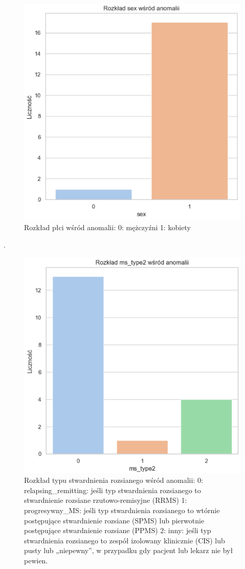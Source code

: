 \documentclass[a4paper,fleqn]{cas-dc}
\begin{document}
\begin{figure}[h]
	\includegraphics[scale=.57]{wykresy/wykres8.png}
	\caption{Rozkład płci wśród anomalii: 0: mężczyźni 1: kobiety}
	\label{FIG:1}
\end{figure}
\newpage
.
\newpage
\begin{figure}[h]
	\includegraphics[scale=.80]{wykresy/wykres9.png}
	\caption{Rozkład typu stwardnienia rozsianego wśród anomalii:  0: relapsing\_remitting: jeśli typ stwardnienia rozsianego to stwardnienie rozsiane rzutowo-remisyjne (RRMS)
1: progresywny\_MS: jeśli typ stwardnienia rozsianego to wtórnie postępujące stwardnienie rozsiane (SPMS) lub pierwotnie postępujące stwardnienie rozsiane (PPMS)
2: inny: jeśli typ stwardnienia rozsianego to zespół izolowany klinicznie (CIS) lub pusty lub „niepewny”, w przypadku gdy pacjent lub lekarz nie był pewien.}
	\label{FIG:1}
\end{figure}
\end{document}
